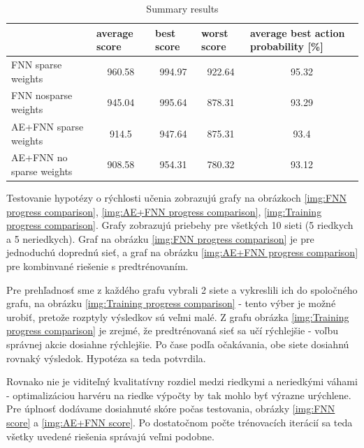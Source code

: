 \documentclass[10pt,a4paper]{article}
\begin{document}
\begin{table}[]
\centering
\caption{Summary results}
\label{tab:summary_results}
\begin{tabular}{|l|c|c|c|c|}
\hline
                         & \multicolumn{1}{l|}{average score} & \multicolumn{1}{l|}{best score} & \multicolumn{1}{l|}{worst score} & \multicolumn{1}{l|}{average best action probability {[}\%{]}} \\ \hline
FNN sparse weights       & 960.58                             & 994.97                          & 922.64                           & 95.32                                                         \\ \hline
FNN nosparse weights     & 945.04                             & 995.64                          & 878.31                           & 93.29                                                         \\ \hline
AE+FNN sparse weights    & 914.5                              & 947.64                          & 875.31                           & 93.4                                                          \\ \hline
AE+FNN no sparse weights & 908.58                             & 954.31                          & 780.32                           & 93.12                                                         \\ \hline
\end{tabular}
\end{table}

Testovanie hypotézy o rýchlosti učenia zobrazujú grafy na obrázkoch
\ref{img:FNN progress comparison}, \ref{img:AE+FNN progress comparison}, \ref{img:Training progress comparison}.
Grafy zobrazujú priebehy pre všetkých 10 sieti (5 riedkych a 5 neriedkych).
Graf na obrázku \ref{img:FNN progress comparison} je pre jednoduchú doprednú sieť,
a graf na obrázku \ref{img:AE+FNN progress comparison} pre kombinvané riešenie s predtrénovaním.

Pre prehľadnosť sme z každého grafu vybrali 2 siete a vykreslili ich do spoločného grafu,
na obrázku \ref{img:Training progress comparison} - tento výber je možné urobiť, pretože rozptyly výsledkov sú
veľmi malé. Z grafu obrázka \ref{img:Training progress comparison} je zrejmé, že predtrénovaná
sieť sa učí rýchlejšie - voľbu správnej akcie dosiahne rýchlejšie.
Po čase podľa očakávania, obe siete dosiahnú rovnaký výsledok. Hypotéza sa teda potvrdila.

Rovnako nie je viditeľný kvalitatívny rozdiel medzi riedkymi a neriedkými váhami - optimalizáciou
harvéru na riedke výpočty by tak mohlo byť výrazne urýchlene.
Pre úplnosť dodávame dosiahnuté skóre počas testovania, obrázky
\ref{img:FNN score} a \ref{img:AE+FNN score}.
Po dostatočnom počte trénovacích iterácií sa teda všetky uvedené riešenia správajú veľmi
podobne.
\end{document}
